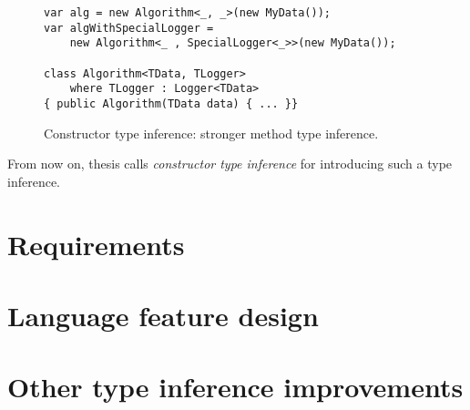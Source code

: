 \begin{figure}[h]
\begin{lstlisting}[style=csharp]
var alg = new Algorithm<_, _>(new MyData());
var algWithSpecialLogger = 
    new Algorithm<_ , SpecialLogger<_>>(new MyData());

class Algorithm<TData, TLogger> 
    where TLogger : Logger<TData> 
{ public Algorithm(TData data) { ... }}
\end{lstlisting}
\caption{Constructor type inference: stronger method type inference.}
\label{img38:sol2}
\end{figure}
\par
From now on, thesis calls \textit{constructor type inference} for introducing such a type inference.

\section{Requirements}

\section{Language feature design}


\section{Other type inference improvements}

